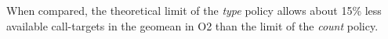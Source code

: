 When compared, the theoretical limit of the \textit{type} policy allows about 15\% less available call-targets in the geomean in O2 than the limit of the \textit{count} policy.

%
%
%	
%
%
%
%	
%	
